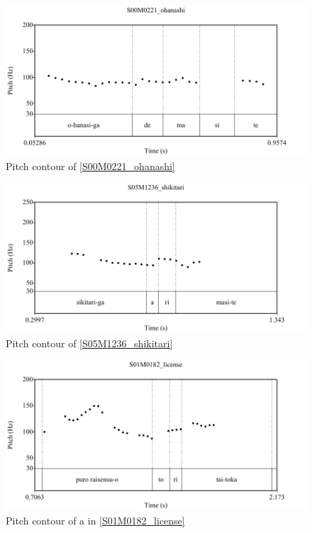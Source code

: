 \begin{figure}
	\begin{center}
	\includegraphics[width=.6\textwidth]{sounds/S00M0221_ohanashi.pdf}
	\caption{Pitch contour of \ref{S00M0221_ohanashi}}
	\label{S00M0221_ohanashiF}
	\end{center}
\end{figure}
\begin{figure}
	\begin{center}
	\includegraphics[width=.6\textwidth]{sounds/S05M1236_shikitari.pdf}
	\caption{Pitch contour of \ref{S05M1236_shikitari}}
	\label{S05M1236_shikitariF}
	\end{center}
\end{figure}
\begin{figure}
	\begin{center}
	\includegraphics[width=.6\textwidth]{sounds/S01M0182_license.pdf}
	\caption{Pitch contour of a in \ref{S01M0182_license}}
	\label{S01M0182_licenseF}
	\end{center}
\end{figure}
